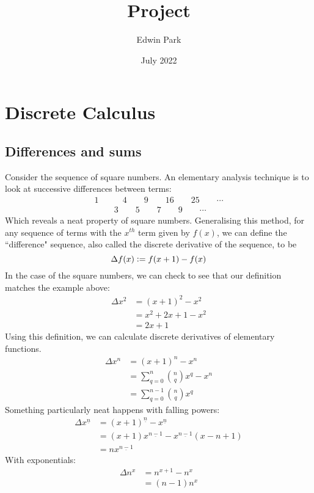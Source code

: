 \documentclass{article}
\title{Project}
\author{Edwin Park}
\date{July 2022}
\renewcommand\({\left(}
\renewcommand\){\right)}
\begin{document}
\clearpage\maketitle\thispagestyle{empty}
\newpage
\tableofcontents
\newpage\setcounter{page}{1}
\section{Discrete Calculus}
\subsection{Differences and sums}
Consider the sequence of square numbers. An elementary analysis technique is to look at successive differences between terms:
\begin{align*}
1\quad&\quad4\quad\quad9\quad\quad16\quad\quad25\quad\quad \cdots\\
&3\quad\quad5\quad\quad7\quad\quad9\quad\quad \cdots
\end{align*}
Which reveals a neat property of square numbers. Generalising this method, for any sequence of terms with the $x^{th}$ term given by $f(x)$, we can define the ``difference" sequence, also called the discrete derivative of the sequence, to be \[\Delta f(x)\vcentcolon=f(x+1)-f(x)\]
In the case of the square numbers, we can check to see that our definition matches the example above:
\begin{align*}
    \Delta x^2&=(x+1)^2-x^2\\
    &=x^2+2x+1-x^2\\
    &=2x+1
\end{align*}
Using this definition, we can calculate discrete derivatives of elementary functions.
\begin{align*}
    \Delta x^n&=(x+1)^n-x^n\\
    &=\sum_{q=0}^n\binom{n}{q}x^q-x^n\\
    &=\sum_{q=0}^{n-1}\binom{n}{q}x^q
\end{align*}
Something particularly neat happens with falling powers:
\begin{align*}
    \Delta x^{\underline{n}}&=(x+1)^{\underline{n}}-x^{\underline{n}}\\
    &=(x+1)x^{\underline{n-1}}-x^{\underline{n-1}}(x-n+1)\\
    &=nx^{\underline{n-1}}
\end{align*}
With exponentials:
\begin{align*}
    \Delta n^x&=n^{x+1}-n^x\\
    &=(n-1)n^{x}\\
\end{align*}
\end{document}
